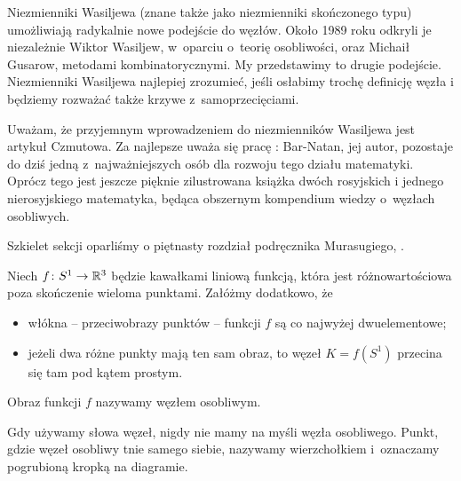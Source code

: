 
Niezmienniki Wasiljewa (znane także jako niezmienniki skończonego typu) umożliwiają radykalnie nowe podejście do węzłów.
Około 1989 roku odkryli je niezależnie Wiktor Wasiljew, w~oparciu o~teorię osobliwości, oraz Michaił Gusarow, metodami kombinatorycznymi.
%
%
My przedstawimy to drugie podejście.
Niezmienniki Wasiljewa najlepiej zrozumieć, jeśli osłabimy trochę definicję węzła i będziemy rozważać także krzywe z~samoprzecięciami.

Uważam, że przyjemnym wprowadzeniem do niezmienników Wasiljewa jest artykuł \cite{chmutov12} Czmutowa.
%
Za najlepsze uważa się pracę \cite{barnatan_95}: Bar-Natan, jej autor, pozostaje do dziś jedną z~najważniejszych osób dla rozwoju tego działu matematyki.
%
Oprócz tego jest jeszcze pięknie zilustrowana książka \cite{duzhin12} dwóch rosyjskich i jednego nierosyjskiego matematyka, będąca obszernym kompendium wiedzy o~węzłach osobliwych.
%
%

Szkielet sekcji oparliśmy o piętnasty rozdział podręcznika Murasugiego, \cite{murasugi96}.

\begin{definition}
%
    Niech $f \colon S^1 \to \mathbb R^3$ będzie kawałkami liniową funkcją, która jest różnowartościowa poza skończenie wieloma punktami.
    Załóżmy dodatkowo, że
    \begin{itemize}
        \item włókna -- przeciwobrazy punktów -- funkcji $f$ są co najwyżej dwuelementowe;
        \item jeżeli dwa różne punkty mają ten sam obraz, to węzeł $K = f(S^1)$ przecina się tam pod kątem prostym.
    \end{itemize}
    Obraz funkcji $f$ nazywamy węzłem osobliwym.
\end{definition}

Gdy używamy słowa węzeł, nigdy nie mamy na myśli węzła osobliwego.
Punkt, gdzie węzeł osobliwy tnie samego siebie, nazywamy wierzchołkiem i~oznaczamy pogrubioną kropką na diagramie.
%

